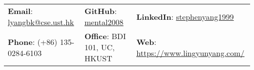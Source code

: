 \documentclass[letterpaper, 10pt]{article}
\begin{document}


\setlength{\tabcolsep}{4pt}


\vspace{0.5cm}
\begin{center}
\begin{tabular}{lll}
\textbf{Email}: \href{mailto:lyangbk@cse.ust.hk}{\underline{lyangbk@cse.ust.hk}} &
\hspace{0.65in} \textbf{GitHub}: \href{https://github.com/mental2008}{\underline{mental2008}} &
\hspace{0.25in} \textbf{LinkedIn}: \href{https://www.linkedin.com/in/stephenyang1999/}{\underline{stephenyang1999}} \\

\textbf{Phone}: (+86) 135-0284-6103 &
\hspace{0.65in} \textbf{Office}: BDI 101, UC, HKUST &
\hspace{0.25in} \textbf{Web}: \href{https://www.lingyunyang.com/}{\underline{https://www.lingyunyang.com/}} \\
\end{tabular}
\end{center}
\end{document}
